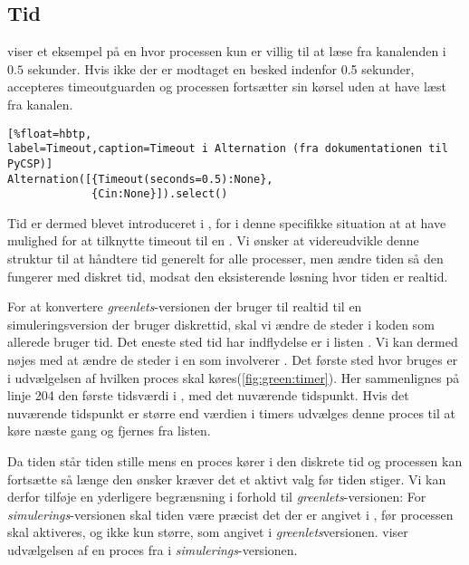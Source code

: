 
\subsection{Tid} \label{sec:tid}
 viser et eksempel på en  hvor processen kun er villig
til at læse fra kanalenden  i $0.5$ sekunder. Hvis ikke der
er modtaget en besked indenfor 0.5 sekunder, accepteres timeoutguarden
og processen fortsætter sin kørsel uden at have læst fra kanalen.

\begin{lstlisting}[%float=hbtp, 
label=Timeout,caption=Timeout i Alternation (fra dokumentationen til PyCSP)]
Alternation([{Timeout(seconds=0.5):None}, 
             {Cin:None}]).select()
\end{lstlisting}

Tid er dermed blevet introduceret i \pycsp, for i denne specifikke situation at at have
mulighed for at tilknytte timeout til en . Vi ønsker
at videreudvikle denne struktur til at håndtere tid generelt for alle
processer, men ændre tiden så den fungerer med diskret tid, modsat den eksisterende
løsning hvor tiden er realtid.

For at konvertere \emph{greenlets}-versionen der bruger  til realtid til en simuleringsversion der bruger diskrettid, skal vi ændre de steder i koden som allerede bruger tid. Det eneste sted tid har indflydelse er i listen . Vi kan dermed nøjes med at ændre de steder i \sched en som involverer . Det første sted hvor  bruges er i udvælgelsen af hvilken proces skal køres(\cref{fig:green:timer}). Her sammenlignes på linje 204 den første tidsværdi i , med det nuværende tidspunkt. Hvis det nuværende tidspunkt er større end værdien i timers udvælges denne proces til at køre næste gang og fjernes fra listen.

Da tiden står tiden stille mens en proces kører i den diskrete tid og processen kan fortsætte så længe den ønsker kræver det et aktivt valg før tiden stiger. Vi kan derfor tilføje en yderligere begrænsning i forhold til \emph{greenlets}-versionen: For \emph{simulerings}-versionen skal tiden være præcist det der er angivet i , før processen skal aktiveres, og ikke kun større, som angivet i \emph{greenlets}versionen.  viser udvælgelsen af en proces fra  i \emph{simulerings}-versionen.

